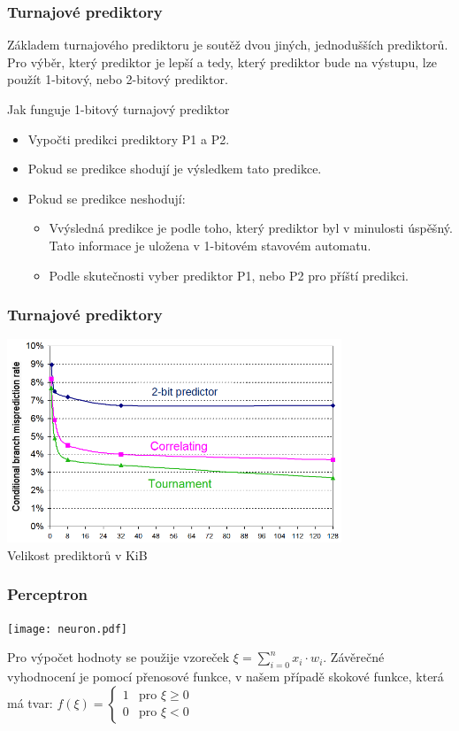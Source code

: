 \documentclass{beamer}
\begin{document}
\begin{frame}
\frametitle{Turnajové prediktory}

Základem turnajového prediktoru je soutěž dvou jiných, jednodušších prediktorů. Pro výběr, který prediktor je lepší a tedy, který prediktor bude na výstupu, lze použít 1-bitový, nebo 2-bitový prediktor. 

\bigskip
Jak funguje 1-bitový turnajový prediktor
\begin{itemize}
\item Vypočti predikci prediktory P1 a P2.
\item Pokud se predikce shodují je výsledkem tato predikce.
\item Pokud se predikce neshodují:
\begin{itemize}
\item Vvýsledná predikce je podle toho, který prediktor byl v minulosti úspěšný. Tato informace je uložena v 1-bitovém stavovém automatu. 
\item Podle skutečnosti vyber prediktor P1, nebo P2 pro příští predikci.
\end{itemize}
\end{itemize}
\end{frame}

\begin{frame}
\frametitle{Turnajové prediktory}

\begin{center}
\includegraphics[width=0.75\textwidth]{fig/tournament.png}\\
\small Velikost prediktorů v KiB
\end{center}

\end{frame}


\begin{frame}
\frametitle{Perceptron}

\begin{center}
\texttt{[image: neuron.pdf]}
\end{center}

Pro výpočet hodnoty se použije vzoreček $\xi = \sum_{i=0}^{n} x_i \cdot w_i$. Závěrečné vyhodnocení je pomocí přenosové funkce, v našem případě skokové funkce, která má tvar:
$f(\xi) = \begin{cases}1& \text{pro } \xi \ge 0\\0& \text{pro }\xi <0\end{cases}$ 
\end{frame}
\end{document}
